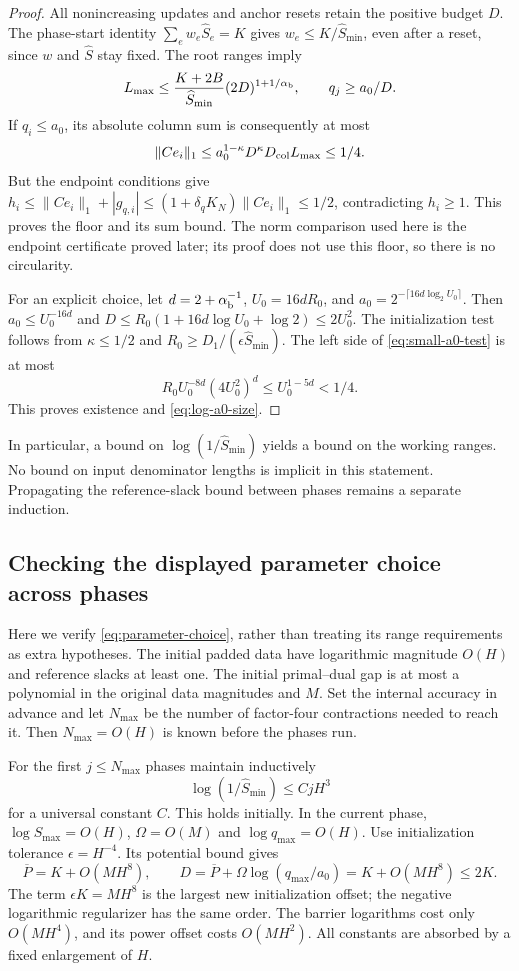 \documentclass[11pt]{article}
\theoremstyle{definition}\newtheorem{definition}[theorem]{Definition}
\theoremstyle{remark}\newtheorem{remark}[theorem]{Remark}
\begin{document}
\begin{proof}
All nonincreasing updates and anchor resets retain the positive budget
$D$.  The phase-start identity $\sum_e w_e\widehat S_e=K$ gives
$w_e\le K/\widehat S_{\min}$, even after a reset, since $w$ and
$\widehat S$ stay fixed.  The root ranges imply
\[
 L_{\max}\le\frac{K+2B}{\widehat S_{\min}}
                      (2D)^{1+1/\alpha_{\rm b}},
 \qquad q_j\ge a_0/D.
\]
If $q_i\le a_0$, its absolute column sum is consequently at most
\[
 \|Ce_i\|_1
 \le a_0^{1-\kappa}D^\kappa D_{\rm col}L_{\max}\le1/4.
\]
But the endpoint conditions give
$h_i\le\|Ce_i\|_1+|g_{q,i}|
\le(1+\delta_qK_N)\|Ce_i\|_1\le1/2$, contradicting $h_i\ge1$.
This proves the floor and its sum bound.  The norm comparison used
here is the endpoint certificate proved later; its proof does not use
this floor, so there is no circularity.

For an explicit choice, let $d=2+\alpha_{\rm b}^{-1}$,
$U_0=16dR_0$, and
$a_0=2^{-\lceil16d\log_2U_0\rceil}$.
Then $a_0\le U_0^{-16d}$ and
$D\le R_0(1+16d\log U_0+\log2)\le2U_0^2$.
The initialization test follows from $\kappa\le1/2$ and
$R_0\ge D_1/(\epsilon\widehat S_{\min})$.
The left side of \eqref{eq:small-a0-test} is at most
\[
 R_0U_0^{-8d}(4U_0^2)^d\le U_0^{1-5d}<1/4.
\]
This proves existence and \eqref{eq:log-a0-size}.
\end{proof}

In particular, a bound on $\log(1/\widehat S_{\min})$ yields a bound
on the working ranges.  No bound on input denominator lengths is
implicit in this statement.  Propagating the reference-slack bound
between phases remains a separate induction.

\subsection{Checking the displayed parameter choice across phases}
\label{app:parameter-check}

Here we verify \eqref{eq:parameter-choice}, rather than treating its
range requirements as extra hypotheses. The initial padded data have
logarithmic magnitude $O(H)$ and reference slacks at least one.
The initial primal--dual gap is at most a polynomial in the original
data magnitudes and $M$. Set the internal accuracy in advance and let
$N_{\max}$ be the number of factor-four contractions needed to reach it.
Then $N_{\max}=O(H)$ is known before the phases run.

For the first $j\le N_{\max}$ phases maintain inductively
\begin{equation}\label{eq:reference-induction}
 \log(1/\widehat S_{\min})\le CjH^3
\end{equation}
for a universal constant $C$. This holds initially. In the current
phase, $\log S_{\max}=O(H)$, $\Omega=O(M)$ and
$\log q_{\max}=O(H)$. Use initialization tolerance $\epsilon=H^{-4}$.
Its potential bound gives
\[
 \overline P=K+O(MH^8),\qquad
 D=\overline P+\Omega\log(q_{\max}/a_0)
      =K+O(MH^8)\le2K.
\]
The term $\epsilon K=MH^8$ is the largest new initialization offset;
the negative logarithmic regularizer has the same order. The barrier
logarithms cost only $O(MH^4)$, and its power offset costs $O(MH^2)$.
All constants are absorbed by a fixed enlargement of $H$.
\end{document}
